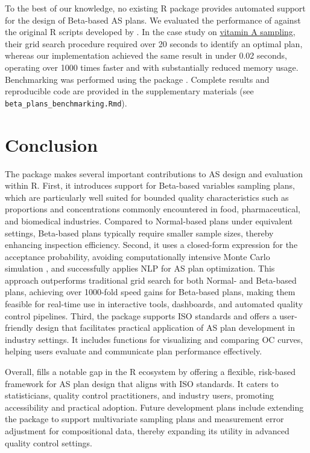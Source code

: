 To the best of our knowledge, no existing R package provides automated support
for the design of Beta-based AS plans. We evaluated the performance of
 against the original R scripts developed by
\citet{govindaraju2015sampling}. In the case study on
\hyperref[subsec:vitA_exp]{vitamin A sampling},
their grid search procedure required over 20 seconds to identify an optimal plan,
whereas our implementation achieved the same result in under 0.02 seconds,
operating over 1000 times faster and with substantially reduced memory usage.
Benchmarking was performed using the  package \citep{R-bench}. Complete
results and reproducible code are provided in the supplementary materials
(see \texttt{beta\_plans\_benchmarking.Rmd}).

\section{Conclusion}\label{conclusion}

The  package makes several important contributions to
AS design and evaluation within R.
First, it introduces support for Beta-based variables sampling plans, which are
particularly well suited for bounded quality characteristics such as proportions
and concentrations commonly encountered in food, pharmaceutical, and biomedical
industries. Compared to Normal-based plans under equivalent settings, Beta-based
plans typically require smaller sample sizes, thereby enhancing inspection
efficiency. Second, it uses a closed-form expression for the acceptance
probability, avoiding computationally intensive Monte Carlo simulation
\citep{govindaraju2015sampling}, and successfully applies NLP for AS plan optimization.
This approach outperforms traditional grid search for both Normal- and Beta-based
plans, achieving over 1000-fold speed gains for Beta-based plans, making them
feasible for real-time use in interactive tools, dashboards, and automated
quality control pipelines. Third, the package supports ISO standards and
offers a user-friendly design that facilitates practical application of AS plan
development in industry settings. It includes functions for visualizing and
comparing OC curves, helping users evaluate and communicate plan performance
effectively.

Overall,  fills a notable gap in the R ecosystem by
offering a flexible, risk-based framework for AS plan design that aligns with
ISO standards. It caters to statisticians, quality control practitioners, and
industry users, promoting accessibility and practical adoption. Future
development plans include extending the package to support multivariate sampling
plans and measurement error adjustment for compositional data, thereby expanding
its utility in advanced quality control settings.

